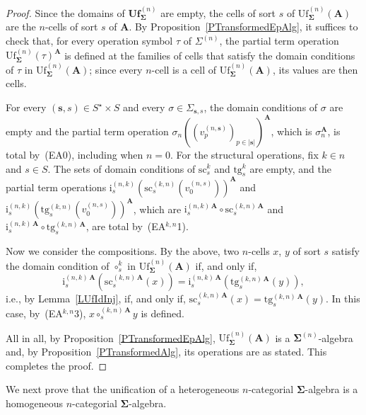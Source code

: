 \documentclass[a4paper, reqno]{amsbook}
\newcommand{\bb}[1]{\ensuremath{\lvert #1 \rvert}}
\newcommand{\sig}[1]{\mathbf{#1}}             %
\newcommand{\src}{\mathrm{sc}}
\newcommand{\tgt}{\mathrm{tg}}
\newcommand{\Uf}{\mathrm{Uf}}
\newcommand{\bUf}{\mathbf{Uf}}
\theoremstyle{plain}
\theoremstyle{definition}
\begin{document}
\begin{proof}
Since the domains of $\bUf^{(n)}_{\sig{\Sigma}}$ are empty, the cells of sort $s$ of $\Uf^{(n)}_{\sig{\Sigma}}(\mathbf{A})$ are the $n$-cells of sort $s$ of $\mathbf{A}$.
By Proposition~\ref{PTransformedEpAlg}, it suffices to check that, for every operation symbol $\tau$ of $\Sigma^{(n)}$, the partial term operation $\Uf^{(n)}_{\sig{\Sigma}}(\tau)^{\mathbf{A}}$ is defined at the families of cells that satisfy the domain conditions of $\tau$ in $\Uf^{(n)}_{\sig{\Sigma}}(\mathbf{A})$; since every $n$-cell is a cell of $\Uf^{(n)}_{\sig{\Sigma}}(\mathbf{A})$, its values are then cells.

For every $(\mathbf{s},s)\in S^{\star}\times S$ and every $\sigma\in\Sigma_{\mathbf{s},s}$, the domain conditions of $\sigma$ are empty and the partial term operation $\sigma_n((v^{(n,\mathbf{s})}_p)_{p\in\bb{\mathbf{s}}})^{\mathbf{A}}$, which is $\sigma_n^{\mathbf{A}}$, is total by~(EA0), including when $n=0$.
For the structural operations, fix $k\in n$ and $s\in S$.
The sets of domain conditions of $\src^{k}_{s}$ and $\tgt^{k}_{s}$ are empty, and the partial term operations $\mathrm{i}^{(n,k)}_s(\src^{(k,n)}_s(v^{(n,s)}_0))^{\mathbf{A}}$ and $\mathrm{i}^{(n,k)}_s(\tgt^{(k,n)}_s(v^{(n,s)}_0))^{\mathbf{A}}$, which are $\mathrm{i}^{(n,k)\,\mathbf{A}}_{s}\circ\src^{(k,n)\,\mathbf{A}}_{s}$ and $\mathrm{i}^{(n,k)\,\mathbf{A}}_{s}\circ\tgt^{(k,n)\,\mathbf{A}}_{s}$, are total by~(EA$^{k,n}$1).

Now we consider the compositions.
By the above, two $n$-cells $x$, $y$ of sort $s$ satisfy the domain condition of $\circ^{k}_{s}$ in $\Uf^{(n)}_{\sig{\Sigma}}(\mathbf{A})$ if, and only if,
$$
\mathrm{i}^{(n,k)\,\mathbf{A}}_{s}\left(\src^{(k,n)\,\mathbf{A}}_{s}(x)\right)=\mathrm{i}^{(n,k)\,\mathbf{A}}_{s}\left(\tgt^{(k,n)\,\mathbf{A}}_{s}(y)\right),
$$
i.e., by Lemma~\ref{LUfIdInj}, if, and only if, $\src^{(k,n)\,\mathbf{A}}_{s}(x)=\tgt^{(k,n)\,\mathbf{A}}_{s}(y)$.
In this case, by~(EA$^{k,n}$3), $x\circ^{(k,n)\,\mathbf{A}}_{s}y$ is defined.

All in all, by Proposition~\ref{PTransformedEpAlg}, $\Uf^{(n)}_{\sig{\Sigma}}(\mathbf{A})$ is a $\sig{\Sigma}^{(n)}$-algebra and, by Proposition~\ref{PTransformedAlg}, its operations are as stated. This completes the proof.
\end{proof}

We next prove that the unification of a heterogeneous $n$-categorial $\sig{\Sigma}$-algebra is a homogeneous $n$-categorial $\sig{\Sigma}$-algebra.
\end{document}
